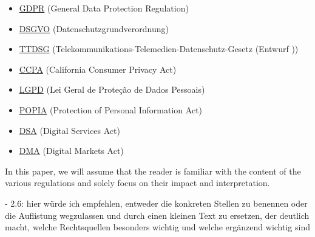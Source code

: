 \begin{itemize}
 \item \href{https://gdpr-info.eu/}{GDPR} (General Data Protection Regulation)
 \item \href{https://www.datenschutz-grundverordnung.eu/}{DSGVO} (Datenschutzgrundverordnung)
 \item \href{https://dsgvo-gesetz.de/ttdsg/}{TTDSG} (Telekommunikations-Telemedien-Datenschutz-Gesetz (Entwurf ))
 \item \href{https://oag.ca.gov/privacy/ccpa}{CCPA} (California Consumer Privacy Act)
 \item \href{https://www.lgpdbrasil.com.br/}{LGPD} (Lei Geral de Proteção de Dados Pessoais)
 \item \href{https://popia.co.za/}{POPIA} (Protection of Personal Information Act)
 \item \href{https://ec.europa.eu/info/strategy/priorities-2019-2024/europe-fit-digital-age/digital-services-act-ensuring-safe-and-accountable-online-environment_en}{DSA} (Digital Services Act)
 \item \href{https://ec.europa.eu/info/strategy/priorities-2019-2024/europe-fit-digital-age/digital-markets-act-ensuring-fair-and-open-digital-markets_en}{DMA} (Digital Markets Act)
\end{itemize}

In this paper, we will assume that the reader is familiar with the content of the various regulations and solely focus on their impact and interpretation.

- 2.6: hier würde ich empfehlen, entweder die konkreten Stellen zu benennen oder die Auflistung wegzulassen und durch einen kleinen Text zu ersetzen, der deutlich macht, welche Rechtsquellen besonders wichtig und welche ergänzend wichtig sind

